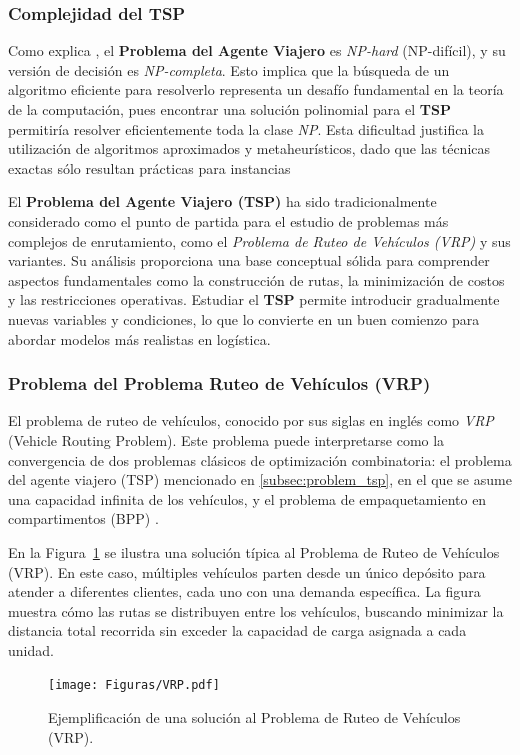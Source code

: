 \documentclass[12pt,titlepage,twoside,openright]{book}
\begin{document}
\subsubsection*{Complejidad del TSP}

Como explica \cite{papadimitriou1998}, el \textbf{Problema del Agente Viajero} es \textit{NP-hard} (NP-difícil), y su versión de decisión es \textit{NP-completa}. Esto implica que la búsqueda de un algoritmo eficiente para resolverlo representa un desafío fundamental en la teoría de la computación, pues encontrar una solución polinomial para el \textbf{TSP} permitiría resolver eficientemente toda la clase \textit{NP}. Esta dificultad justifica la utilización de algoritmos aproximados y metaheurísticos, dado que las técnicas exactas sólo resultan prácticas para instancias

El \textbf{Problema del Agente Viajero (TSP)} ha sido tradicionalmente considerado como el punto de partida para el estudio de problemas más complejos de enrutamiento, como el \textit{Problema de Ruteo de Vehículos (VRP)} y sus variantes. Su análisis proporciona una base conceptual sólida para comprender aspectos fundamentales como la construcción de rutas, la minimización de costos y las restricciones operativas. Estudiar el \textbf{TSP} permite introducir gradualmente nuevas variables y condiciones, lo que lo convierte en un buen comienzo para abordar modelos más realistas en logística.

\subsubsection{Problema del Problema Ruteo de Vehículos (VRP)}
\label{subsec:problem_vrp}
El problema de ruteo de vehículos, conocido por sus siglas en inglés como \textit{VRP} (Vehicle Routing Problem). Este problema puede interpretarse como la convergencia de dos problemas clásicos de optimización combinatoria: el problema del agente viajero (TSP) mencionado en \autoref{subsec:problem_tsp}, en el que se asume una capacidad infinita de los vehículos, y el problema de empaquetamiento en compartimentos (BPP) \cite{daza2009}.

En la Figura~\ref{fig:vrp} se ilustra una solución típica al Problema de Ruteo de Vehículos (VRP). En este caso, múltiples vehículos parten desde un único depósito para atender a diferentes clientes, cada uno con una demanda específica. La figura muestra cómo las rutas se distribuyen entre los vehículos, buscando minimizar la distancia total recorrida sin exceder la capacidad de carga asignada a cada unidad.
\begin{figure}[H]
	\centering
	\texttt{[image: Figuras/VRP.pdf]}
	\caption{Ejemplificación de una solución al Problema de Ruteo de Vehículos (VRP).}
	\label{fig:vrp}
\end{figure}
\end{document}

